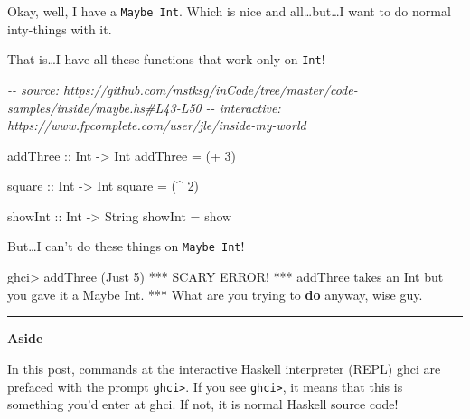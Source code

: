 \documentclass[]{article}
\newenvironment{Shaded}{}{}
\newcommand{\CommentTok}[1]{\textcolor[rgb]{0.38,0.63,0.69}{\textit{#1}}}
\newcommand{\DataTypeTok}[1]{\textcolor[rgb]{0.56,0.13,0.00}{#1}}
\newcommand{\DecValTok}[1]{\textcolor[rgb]{0.25,0.63,0.44}{#1}}
\newcommand{\FunctionTok}[1]{\textcolor[rgb]{0.02,0.16,0.49}{#1}}
\newcommand{\KeywordTok}[1]{\textcolor[rgb]{0.00,0.44,0.13}{\textbf{#1}}}
\newcommand{\NormalTok}[1]{#1}
\newcommand{\OperatorTok}[1]{\textcolor[rgb]{0.40,0.40,0.40}{#1}}
\newcommand{\OtherTok}[1]{\textcolor[rgb]{0.00,0.44,0.13}{#1}}
\begin{document}
Okay, well, I have a \texttt{Maybe\ Int}. Which is nice and
all\ldots but\ldots I want to do normal inty-things with it.

That is\ldots I have all these functions that work only on \texttt{Int}!

\begin{Shaded}
\begin{Highlighting}[]
\CommentTok{{-}{-} source: https://github.com/mstksg/inCode/tree/master/code{-}samples/inside/maybe.hs\#L43{-}L50}
\CommentTok{{-}{-} interactive: https://www.fpcomplete.com/user/jle/inside{-}my{-}world}

\OtherTok{addThree ::} \DataTypeTok{Int} \OtherTok{{-}\textgreater{}} \DataTypeTok{Int}
\NormalTok{addThree }\OtherTok{=}\NormalTok{ (}\OperatorTok{+} \DecValTok{3}\NormalTok{)}

\OtherTok{square ::} \DataTypeTok{Int} \OtherTok{{-}\textgreater{}} \DataTypeTok{Int}
\NormalTok{square }\OtherTok{=}\NormalTok{ (}\OperatorTok{\^{}} \DecValTok{2}\NormalTok{)}

\FunctionTok{showInt}\OtherTok{ ::} \DataTypeTok{Int} \OtherTok{{-}\textgreater{}} \DataTypeTok{String}
\FunctionTok{showInt} \OtherTok{=} \FunctionTok{show}
\end{Highlighting}
\end{Shaded}

But\ldots I can't do these things on \texttt{Maybe\ Int}!

\begin{Shaded}
\begin{Highlighting}[]
\NormalTok{ghci}\OperatorTok{\textgreater{}}\NormalTok{ addThree (}\DataTypeTok{Just} \DecValTok{5}\NormalTok{)}
\OperatorTok{***} \DataTypeTok{SCARY} \DataTypeTok{ERROR}\OperatorTok{!}
\OperatorTok{***}\NormalTok{ addThree takes an }\DataTypeTok{Int}\NormalTok{ but you gave it a }\DataTypeTok{Maybe} \DataTypeTok{Int}\OperatorTok{.}
\OperatorTok{***} \DataTypeTok{What}\NormalTok{ are you trying to }\KeywordTok{do}\NormalTok{ anyway, wise guy}\OperatorTok{.}
\end{Highlighting}
\end{Shaded}

\begin{center}\rule{0.5\linewidth}{0.5pt}\end{center}

\textbf{Aside}

In this post, commands at the interactive Haskell interpreter (REPL) ghci are
prefaced with the prompt \texttt{ghci\textgreater{}}. If you see
\texttt{ghci\textgreater{}}, it means that this is something you'd enter at
ghci. If not, it is normal Haskell source code!
\end{document}
